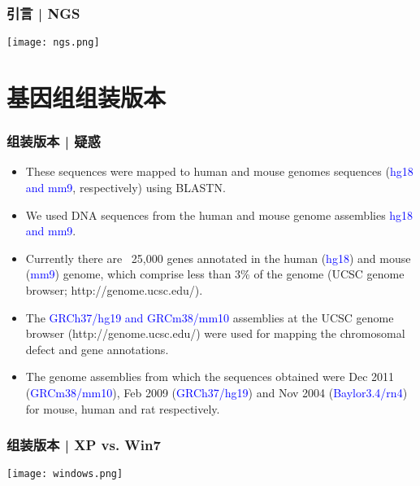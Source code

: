 \begin{frame}
  \frametitle{引言 | NGS}
  \begin{center}
    \texttt{[image: ngs.png]}
  \end{center}
\end{frame}

\section{基因组组装版本}
\begin{frame}
  \frametitle{组装版本 | 疑惑}
  \begin{itemize}
    \item These sequences were mapped to human and mouse genomes sequences (\textcolor{blue}{hg18 and mm9}, respectively) using BLASTN.
    \item We used DNA sequences from the human and mouse genome assemblies \textcolor{blue}{hg18 and mm9}.
    \item Currently there are ~25,000 genes annotated in the human (\textcolor{blue}{hg18}) and mouse (\textcolor{blue}{mm9}) genome, which comprise less than 3\% of the genome (UCSC genome browser; http://genome.ucsc.edu/).
    \item The \textcolor{blue}{GRCh37/hg19 and GRCm38/mm10} assemblies at the UCSC genome browser (http://genome.ucsc.edu/) were used for mapping the chromosomal defect and gene annotations.
    \item The genome assemblies from which the sequences obtained were Dec 2011 (\textcolor{blue}{GRCm38/mm10}), Feb 2009 (\textcolor{blue}{GRCh37/hg19}) and Nov 2004 (\textcolor{blue}{Baylor3.4/rn4}) for mouse, human and rat respectively.
  \end{itemize}
\end{frame}


\begin{frame}
  \frametitle{组装版本 | XP vs. Win7}
  \begin{center}
    \texttt{[image: windows.png]}
  \end{center}
\end{frame}

